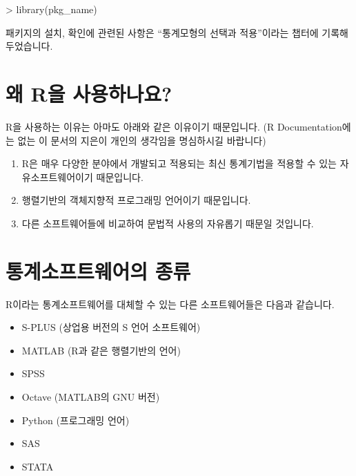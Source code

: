  \begin{Schunk}
 \begin{Soutput}
 > library(pkg_name)	
 \end{Soutput}
\end{Schunk}

패키지의 설치, 확인에 관련된 사항은 ``통계모형의 선택과 적용''이라는 챕터에 기록해두었습니다. 




\section{왜 R을 사용하나요?}

R을 사용하는 이유는 아마도 아래와 같은 이유이기 때문입니다. 
(R Documentation에는 없는 이 문서의 지은이 개인의 생각임을 명심하시길 바랍니다)

\begin{enumerate}
	\item R은 매우 다양한 분야에서 개발되고 적용되는 최신 통계기법을 적용할 수 있는 자유소프트웨어이기 때문입니다.
	\item 행렬기반의 객체지향적 프로그래밍 언어이기 때문입니다.
	\item 다른 소프트웨어들에 비교하여 문법적 사용의 자유롭기 때문일 것입니다.
\end{enumerate}


\section{통계소프트웨어의 종류}

R이라는 통계소프트웨어를 대체할 수 있는 다른 소프트웨어들은 다음과 같습니다. 

\begin{itemize}
\item S-PLUS (상업용 버전의 S 언어 소프트웨어)
\item MATLAB (R과 같은 행렬기반의 언어)
\item SPSS
\item Octave (MATLAB의 GNU 버전)
\item Python (프로그래밍 언어)
\item SAS
\item STATA
\end{itemize}


%
%



